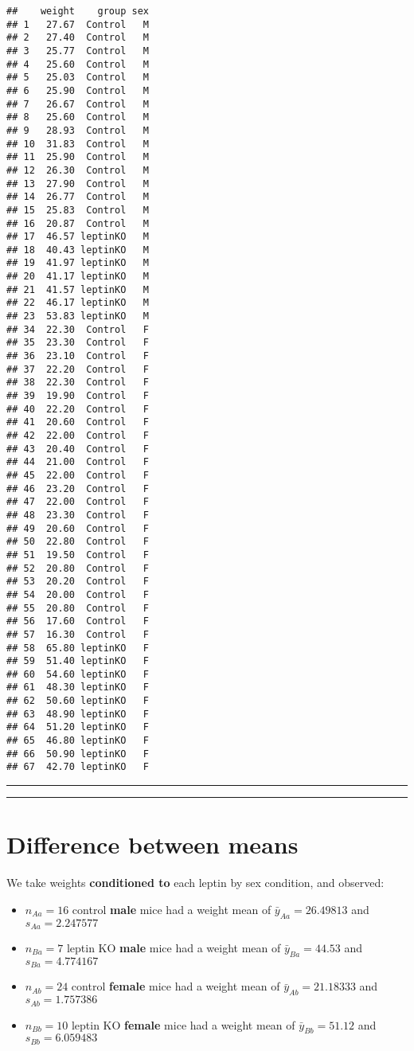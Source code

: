 \documentclass[
]{book}
\begin{document}
\begin{verbatim}
##    weight    group sex
## 1   27.67  Control   M
## 2   27.40  Control   M
## 3   25.77  Control   M
## 4   25.60  Control   M
## 5   25.03  Control   M
## 6   25.90  Control   M
## 7   26.67  Control   M
## 8   25.60  Control   M
## 9   28.93  Control   M
## 10  31.83  Control   M
## 11  25.90  Control   M
## 12  26.30  Control   M
## 13  27.90  Control   M
## 14  26.77  Control   M
## 15  25.83  Control   M
## 16  20.87  Control   M
## 17  46.57 leptinKO   M
## 18  40.43 leptinKO   M
## 19  41.97 leptinKO   M
## 20  41.17 leptinKO   M
## 21  41.57 leptinKO   M
## 22  46.17 leptinKO   M
## 23  53.83 leptinKO   M
## 34  22.30  Control   F
## 35  23.30  Control   F
## 36  23.10  Control   F
## 37  22.20  Control   F
## 38  22.30  Control   F
## 39  19.90  Control   F
## 40  22.20  Control   F
## 41  20.60  Control   F
## 42  22.00  Control   F
## 43  20.40  Control   F
## 44  21.00  Control   F
## 45  22.00  Control   F
## 46  23.20  Control   F
## 47  22.00  Control   F
## 48  23.30  Control   F
## 49  20.60  Control   F
## 50  22.80  Control   F
## 51  19.50  Control   F
## 52  20.80  Control   F
## 53  20.20  Control   F
## 54  20.00  Control   F
## 55  20.80  Control   F
## 56  17.60  Control   F
## 57  16.30  Control   F
## 58  65.80 leptinKO   F
## 59  51.40 leptinKO   F
## 60  54.60 leptinKO   F
## 61  48.30 leptinKO   F
## 62  50.60 leptinKO   F
## 63  48.90 leptinKO   F
## 64  51.20 leptinKO   F
## 65  46.80 leptinKO   F
## 66  50.90 leptinKO   F
## 67  42.70 leptinKO   F
\end{verbatim}

\begin{center}\rule{0.5\linewidth}{0.5pt}\end{center}

\begin{center}\rule{0.5\linewidth}{0.5pt}\end{center}

\hypertarget{difference-between-means-10}{%
\section{Difference between means}\label{difference-between-means-10}}

We take weights \textbf{conditioned to} each leptin by sex condition, and observed:

\begin{itemize}
\item
  \(n_{Aa}=16\) control \textbf{male} mice had a weight mean of \(\bar{y}_{Aa}=26.49813\) and \(s_{Aa}=2.247577\)
\item
  \(n_{Ba}=7\) leptin KO \textbf{male} mice had a weight mean of \(\bar{y}_{Ba}=44.53\) and \(s_{Ba}=4.774167\)
\item
  \(n_{Ab}=24\) control \textbf{female} mice had a weight mean of \(\bar{y}_{Ab}=21.18333\) and \(s_{Ab}=1.757386\)
\item
  \(n_{Bb}=10\) leptin KO \textbf{female} mice had a weight mean of \(\bar{y}_{Bb}=51.12\) and \(s_{Bb}=6.059483\)
\end{itemize}
\end{document}
